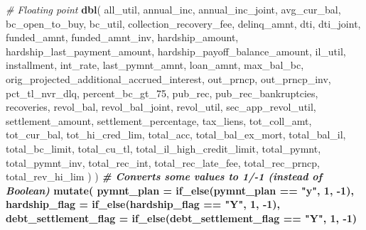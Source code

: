 \documentclass[11pt,]{report}
\newenvironment{Shaded}{\begin{snugshade}}{\end{snugshade}}
\newcommand{\CommentTok}[1]{\textcolor[rgb]{0.56,0.35,0.01}{\textit{#1}}}
\newcommand{\DataTypeTok}[1]{\textcolor[rgb]{0.13,0.29,0.53}{#1}}
\newcommand{\DecValTok}[1]{\textcolor[rgb]{0.00,0.00,0.81}{#1}}
\newcommand{\KeywordTok}[1]{\textcolor[rgb]{0.13,0.29,0.53}{\textbf{#1}}}
\newcommand{\NormalTok}[1]{#1}
\newcommand{\OperatorTok}[1]{\textcolor[rgb]{0.81,0.36,0.00}{\textbf{#1}}}
\newcommand{\StringTok}[1]{\textcolor[rgb]{0.31,0.60,0.02}{#1}}
\begin{document}
\begin{Shaded}
\begin{Highlighting}[numbers=left,,]
{{{{      \CommentTok{# Floating point}
      \KeywordTok{dbl}\NormalTok{(}
\NormalTok{        all_util,}
\NormalTok{        annual_inc,}
\NormalTok{        annual_inc_joint,}
\NormalTok{        avg_cur_bal,}
\NormalTok{        bc_open_to_buy,}
\NormalTok{        bc_util,}
\NormalTok{        collection_recovery_fee,}
\NormalTok{        delinq_amnt,}
\NormalTok{        dti,}
\NormalTok{        dti_joint,}
\NormalTok{        funded_amnt,}
\NormalTok{        funded_amnt_inv,}
\NormalTok{        hardship_amount,}
\NormalTok{        hardship_last_payment_amount,}
\NormalTok{        hardship_payoff_balance_amount,}
\NormalTok{        il_util,}
\NormalTok{        installment,}
\NormalTok{        int_rate,}
\NormalTok{        last_pymnt_amnt,}
\NormalTok{        loan_amnt,}
\NormalTok{        max_bal_bc,}
\NormalTok{        orig_projected_additional_accrued_interest,}
\NormalTok{        out_prncp,}
\NormalTok{        out_prncp_inv,}
\NormalTok{        pct_tl_nvr_dlq,}
\NormalTok{        percent_bc_gt_}\DecValTok{75}\NormalTok{,}
\NormalTok{        pub_rec,}
\NormalTok{        pub_rec_bankruptcies,}
\NormalTok{        recoveries,}
\NormalTok{        revol_bal,}
\NormalTok{        revol_bal_joint,}
\NormalTok{        revol_util,}
\NormalTok{        sec_app_revol_util,}
\NormalTok{        settlement_amount,}
\NormalTok{        settlement_percentage,}
\NormalTok{        tax_liens,}
\NormalTok{        tot_coll_amt,}
\NormalTok{        tot_cur_bal,}
\NormalTok{        tot_hi_cred_lim,}
\NormalTok{        total_acc,}
\NormalTok{        total_bal_ex_mort,}
\NormalTok{        total_bal_il,}
\NormalTok{        total_bc_limit,}
\NormalTok{        total_cu_tl,}
\NormalTok{        total_il_high_credit_limit,}
\NormalTok{        total_pymnt,}
\NormalTok{        total_pymnt_inv,}
\NormalTok{        total_rec_int,}
\NormalTok{        total_rec_late_fee,}
\NormalTok{        total_rec_prncp,}
\NormalTok{        total_rev_hi_lim}
\NormalTok{      )}
\NormalTok{    ) }\OperatorTok{%
\StringTok{    }
\StringTok{    }\CommentTok{# Converts some values to 1/-1 (instead of Boolean)}
\StringTok{    }\KeywordTok{mutate}\NormalTok{(}
      \DataTypeTok{pymnt_plan =}           \KeywordTok{if_else}\NormalTok{(pymnt_plan }\OperatorTok{==}\StringTok{ "y"}\NormalTok{,           }\DecValTok{1}\NormalTok{, }\DecValTok{-1}\NormalTok{),}
      \DataTypeTok{hardship_flag =}        \KeywordTok{if_else}\NormalTok{(hardship_flag }\OperatorTok{==}\StringTok{ "Y"}\NormalTok{,        }\DecValTok{1}\NormalTok{, }\DecValTok{-1}\NormalTok{),}
      \DataTypeTok{debt_settlement_flag =} \KeywordTok{if_else}\NormalTok{(debt_settlement_flag }\OperatorTok{==}\StringTok{ "Y"}\NormalTok{, }\DecValTok{1}\NormalTok{, }\DecValTok{-1}\NormalTok{)}
}}}}}
\end{Highlighting}
\end{Shaded}
\end{document}
